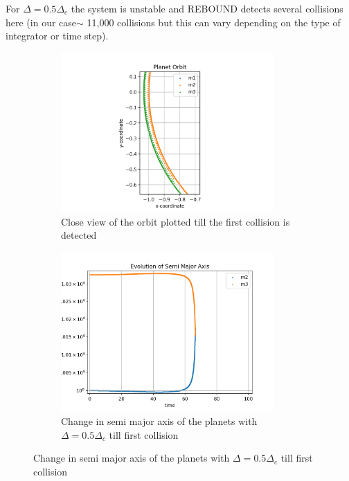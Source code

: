 \documentclass[12pt,a4paper]{article}
\begin{document}
For $\Delta=0.5\Delta_c$ the system is unstable and REBOUND detects several collisions here (in our case$ \sim $ 11,000 collisions but this can vary depending on the type of integrator or time step).

\begin{figure}[H]
  \centering
  \begin{subfigure}{0.4\textwidth}
    \centering
    \includegraphics[height = 2.4in]{3Body/3BD_orbit_delta0.5_till_collision.png}
    \caption{Close view of the orbit plotted till the first collision is detected}
    \label{fig:3Body_0.5_short}
  \end{subfigure}
  \begin{subfigure}{0.4\textwidth}
    \centering
    \includegraphics[height = 2.4in]{3Body/3BD_a_delta0.5_till_collision.png}
    \caption{Change in semi major axis of the planets with $\Delta = 0.5\Delta_c$ till first collision}
    \label{fig:3Body_0.5_a}
  \end{subfigure}


\end{figure}
\end{document}
